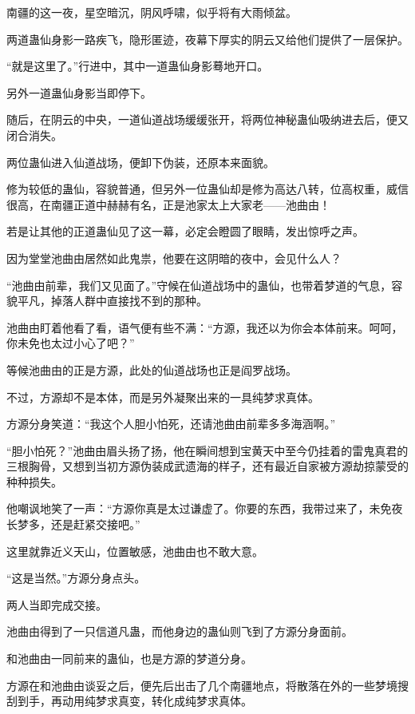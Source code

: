 
\begin{this_body}

南疆的这一夜，星空暗沉，阴风呼啸，似乎将有大雨倾盆。

两道蛊仙身影一路疾飞，隐形匿迹，夜幕下厚实的阴云又给他们提供了一层保护。

“就是这里了。”行进中，其中一道蛊仙身影蓦地开口。

另外一道蛊仙身影当即停下。

随后，在阴云的中央，一道仙道战场缓缓张开，将两位神秘蛊仙吸纳进去后，便又闭合消失。

两位蛊仙进入仙道战场，便卸下伪装，还原本来面貌。

修为较低的蛊仙，容貌普通，但另外一位蛊仙却是修为高达八转，位高权重，威信很高，在南疆正道中赫赫有名，正是池家太上大家老——池曲由！

若是让其他的正道蛊仙见了这一幕，必定会瞪圆了眼睛，发出惊呼之声。

因为堂堂池曲由居然如此鬼祟，他要在这阴暗的夜中，会见什么人？

“池曲由前辈，我们又见面了。”守候在仙道战场中的蛊仙，也带着梦道的气息，容貌平凡，掉落人群中直接找不到的那种。

池曲由盯着他看了看，语气便有些不满：“方源，我还以为你会本体前来。呵呵，你未免也太过小心了吧？”

等候池曲由的正是方源，此处的仙道战场也正是阎罗战场。

不过，方源却不是本体，而是另外凝聚出来的一具纯梦求真体。

方源分身笑道：“我这个人胆小怕死，还请池曲由前辈多多海涵啊。”

“胆小怕死？”池曲由眉头扬了扬，他在瞬间想到宝黄天中至今仍挂着的雷鬼真君的三根胸骨，又想到当初方源伪装成武遗海的样子，还有最近自家被方源劫掠蒙受的种种损失。

他嘲讽地笑了一声：“方源你真是太过谦虚了。你要的东西，我带过来了，未免夜长梦多，还是赶紧交接吧。”

这里就靠近义天山，位置敏感，池曲由也不敢大意。

“这是当然。”方源分身点头。

两人当即完成交接。

池曲由得到了一只信道凡蛊，而他身边的蛊仙则飞到了方源分身面前。

和池曲由一同前来的蛊仙，也是方源的梦道分身。

方源在和池曲由谈妥之后，便先后出击了几个南疆地点，将散落在外的一些梦境搜刮到手，再动用纯梦求真变，转化成纯梦求真体。


\end{this_body}
